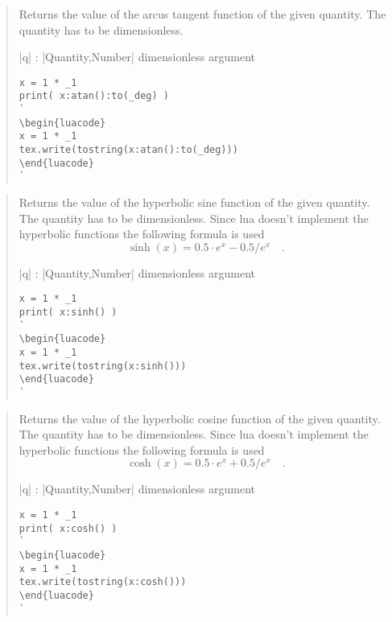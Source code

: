 \documentclass{ltxdoc}
\begin{document}
\begin{quote}
  Returns the value of the arcus tangent function of the given quantity. The quantity has to be dimensionless.

  \begin{description}
  \item |q| : |Quantity,Number| dimensionless argument
  \end{description}

\begin{lstlisting}
x = 1 * _1
print( x:atan():to(_deg) )
`
\begin{luacode}
x = 1 * _1
tex.write(tostring(x:atan():to(_deg)))
\end{luacode}
`
\end{lstlisting}

\end{quote}




\begin{quote}
  Returns the value of the hyperbolic sine function of the given quantity. The quantity has to be dimensionless. Since lua doesn't implement the hyperbolic functions the following formula is used 
  $$
    \sinh(x) = 0.5 \cdot e^x - 0.5 / e^x  \quad.
  $$

  \begin{description}
  \item |q| : |Quantity,Number| dimensionless argument
  \end{description}

\begin{lstlisting}
x = 1 * _1
print( x:sinh() )
`
\begin{luacode}
x = 1 * _1
tex.write(tostring(x:sinh()))
\end{luacode}
`
\end{lstlisting}

\end{quote}



\begin{quote}
  Returns the value of the hyperbolic cosine function of the given quantity. The quantity has to be dimensionless. Since lua doesn't implement the hyperbolic functions the following formula is used 
  $$
    \cosh(x) = 0.5 \cdot e^x + 0.5 / e^x  \quad.
  $$

  \begin{description}
  \item |q| : |Quantity,Number| dimensionless argument
  \end{description}

\begin{lstlisting}
x = 1 * _1
print( x:cosh() )
`
\begin{luacode}
x = 1 * _1
tex.write(tostring(x:cosh()))
\end{luacode}
`
\end{lstlisting}

\end{quote}
\end{document}
